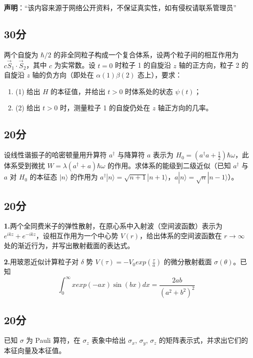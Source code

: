 
\textbf{声明}：“该内容来源于网络公开资料，不保证真实性，如有侵权请联系管理员”

\subsection{30分}
两个自旋为 $\hbar/2$ 的非全同粒子构成一个复合体系，设两个粒子间的相互作用为 $c\vec{S}_1 \cdot \vec{S}_2$，其中 $c$ 为实常数。设 $t=0$ 时粒子 1 的自旋沿 $z$ 轴的正方向，粒子 2 的自旋沿 $z$ 轴的负方向（即处在 $\alpha(1)\beta(2)$ 态上），要求：

\begin{enumerate}
    \item (1) 给出 $H$ 的本征值，并给出 $t > 0$ 时体系处的状态 $\psi(t)$；
    \item (2) 给出 $t > 0$ 时，测量粒子 1 的自旋仍处在 $z$ 轴正方向的几率。
\end{enumerate}
\subsection{20分}
设线性谐振子的哈密顿量用升算符 $a^\dagger$ 与降算符 $a$ 表示为 $H_0 = \left(a^\dagger a + \frac{1}{2}\right)\hbar\omega$，此体系受到微扰 $W = \lambda(a^\dagger + a)\hbar\omega$ 的作用。求体系的能级到二级近似（已知 $a^\dagger$ 与 $a$ 对 $H_0$ 的本征态 $|n\rangle$ 的作用为 $a^\dagger|n\rangle = \sqrt{n+1}|n+1\rangle$，$a|n\rangle = \sqrt{n}|n-1\rangle$）。
\subsection{20分}
\textbf{1.}两个全同费米子的弹性散射，在原心系中入射波（空间波函数）表示为 $e^{ikz} + e^{-ikz}$，设相互作用为一个中心势 $V(r)$，给出体系的空间波函数在 $r \to \infty$ 处的渐近行为，并写出散射截面的表达式。

\textbf{2.}用玻恩近似计算粒子对 $\delta$ 势 $V(\tau) = -V_0 exp(\frac{  \tau}{a})$ 的微分散射截面 $\sigma(\theta)$。已知
$$\int_{0}^{\infty} xexp(-ax) \sin(bx) dx = \frac{2ab}{(a^2 + b^2)^2}~$$
\subsection{20分}
已知 $\sigma$ 为 Pauli 算符，在 $ \sigma_z$ 表象中给出 $\sigma_x$, $\sigma_y$, $\sigma_z$ 的矩阵表示式，并求出它们的本征向量及本征值。
